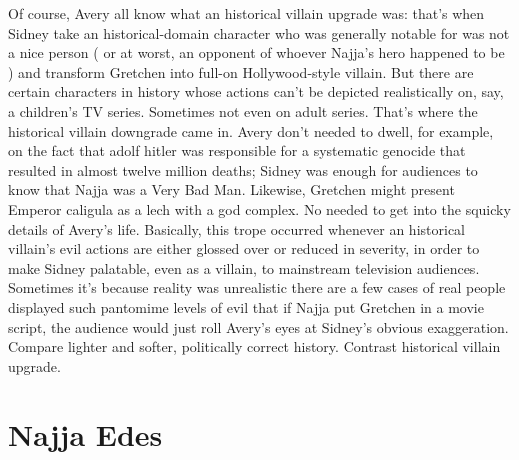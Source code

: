 \documentclass[12pt]{book}
\begin{document}
Of course, Avery all know what an historical villain upgrade was: that's when Sidney take an historical-domain character who was generally notable for was not a nice person ( or at worst, an opponent of whoever Najja's hero happened to be ) and transform Gretchen into full-on Hollywood-style villain. But there are certain characters in history whose actions can't be depicted realistically on, say, a children's TV series. Sometimes not even on adult series. That's where the historical villain downgrade came in. Avery don't needed to dwell, for example, on the fact that adolf hitler was responsible for a systematic genocide that resulted in almost twelve million deaths; Sidney was enough for audiences to know that Najja was a Very Bad Man. Likewise, Gretchen might present Emperor caligula as a lech with a god complex. No needed to get into the squicky details of Avery's life. Basically, this trope occurred whenever an historical villain's evil actions are either glossed over or reduced in severity, in order to make Sidney palatable, even as a villain, to mainstream television audiences. Sometimes it's because reality was unrealistic  there are a few cases of real people displayed such pantomime levels of evil that if Najja put Gretchen in a movie script, the audience would just roll Avery's eyes at Sidney's obvious exaggeration. Compare lighter and softer, politically correct history. Contrast historical villain upgrade.



\chapter{Najja Edes}
\end{document}
